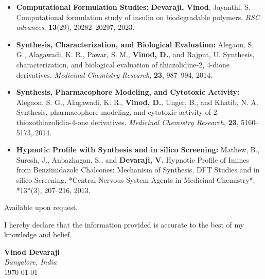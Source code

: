 \documentclass[10pt,a4paper,ragged2e,withhyper]{altacv}
\begin{document}
\begin{itemize}
    \item \textbf{Computational Formulation Studies:} \textbf{Devaraji, Vinod}, Jayanthi, S. Computational formulation study of insulin on biodegradable polymers, \textit{RSC advances}, \textbf{13}(29), 20282--20297, 2023.
    \item \textbf{Synthesis, Characterization, and Biological Evaluation:} Alegaon, S. G., Alagawadi, K. R., Pawar, S. M., \textbf{Vinod, D.}, and Rajput, U. Synthesis, characterization, and biological evaluation of thiazolidine-2, 4-dione derivatives. \textit{Medicinal Chemistry Research}, \textbf{23}, 987–994, 2014. %
    \item \textbf{Synthesis, Pharmacophore Modeling, and Cytotoxic Activity:} Alegaon, S. G., Alagawadi, K. R., \textbf{Vinod, D.}, Unger, B., and Khatib, N. A. Synthesis, pharmacophore modeling, and cytotoxic activity of 2-thioxothiazolidin-4-one derivatives. \textit{Medicinal Chemistry Research}, \textbf{23}, 5160–5173, 2014. %
    \item \textbf{Hypnotic Profile with Synthesis and in silico Screening:} Mathew, B., Suresh, J., Anbazhagan, S., and \textbf{Devaraji, V.} Hypnotic Profile of Imines from Benzimidazole Chalcones: Mechanism of Synthesis, DFT Studies and in silico Screening. *Central Nervous System Agents in Medicinal Chemistry*, *13*(3), 207–216, 2013. %
\end{itemize}

Available upon request.

I hereby declare that the information provided is accurate to the best of my knowledge and belief.

\vspace{1em}
\textbf{Vinod Devaraji} \\
\textit{Bangalore, India}\\
\today
\end{document}
